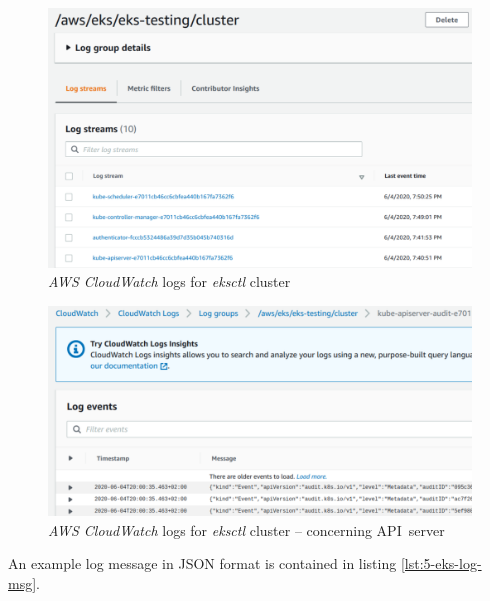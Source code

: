 \begin{figure}[H]
    \centering
    \includegraphics[width=16cm]{figures/eks-cw-small.png}
    \captionsetup{justification=centering,margin=2cm}
    \caption{\textit{AWS CloudWatch} logs for \textit{eksctl} cluster}
    \label{eks-cw-small}
\end{figure}
\begin{figure}[H]
    \centering
    \includegraphics[width=16cm]{figures/eks-cw-apiserver-small.png}
    \captionsetup{justification=centering,margin=2cm}
    \caption{\textit{AWS CloudWatch} logs for \textit{eksctl} cluster -- concerning API~server}
    \label{eks-cw-apiserver-small}
\end{figure}

An example log message in JSON format is contained in listing \ref{lst:5-eks-log-msg}.

